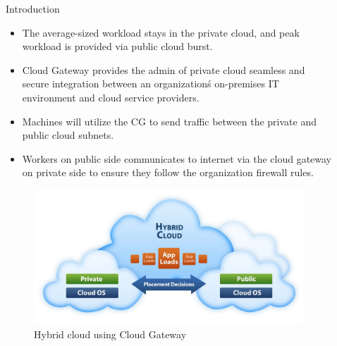 \documentclass[final]{beamer}
\newlength{\sepwid}
\newlength{\onecolwid}
\newlength{\twocolwid}
\begin{document}
\begin{frame}[t]
\begin{columns}[t]
\begin{column}{\onecolwid}
\begin{block}{Introduction}
\begin{itemize}
\item The average-sized workload stays in the private cloud, and peak workload is provided via public cloud burst.
\item Cloud Gateway provides the admin of private cloud seamless and secure integration between an organization\'s on-premises IT environment and cloud service providers.
\item Machines will utilize the CG to send traffic between the private and public cloud subnets.
\item Workers on public side communicates to internet via the cloud gateway on private side to ensure they follow the organization firewall rules.
\end{itemize}



\end{block}


\begin{figure}
\includegraphics[width=0.8\linewidth]{bigpic.png}
\caption{Hybrid cloud using Cloud Gateway}
\end{figure}


\end{column} %

\begin{column}{\sepwid}\end{column} %

\begin{column}{\twocolwid} %

\begin{columns}[t,totalwidth=\twocolwid] %

\begin{column}{\onecolwid}\vspace{-.6in} %


\end{column}
\end{columns}
\end{column}
\end{columns}
\end{frame}
\end{document}
